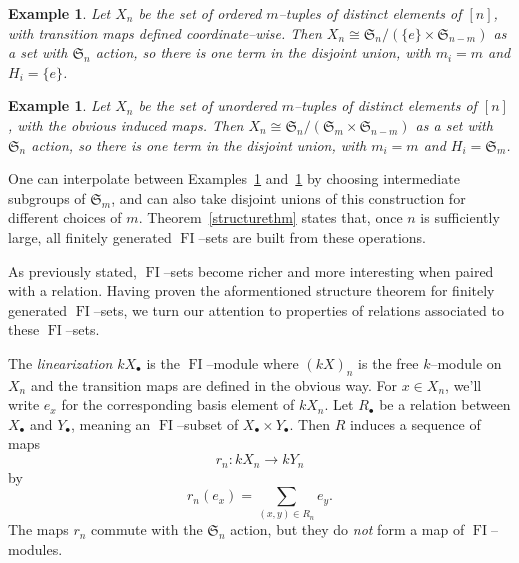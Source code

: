 \documentclass[10pt]{amsart}
\DeclareMathOperator{\FI}{FI}
\newcommand{\Sn}{\mathfrak{S}}
\newcommand{\dt}{\bullet}
\newtheorem{example}[theorem]{Example}
\theoremstyle{definition}
\begin{document}
\begin{example} \label{TheoremAExample1}
Let $X_n$ be the set of ordered $m$--tuples of distinct elements of $[n]$, with transition maps defined coordinate--wise. Then $X_n \cong \Sn_n/(\{ e \} \times \Sn_{n-m} )$ as a set with $\Sn_n$ action, so there is one term in the disjoint union, with $m_i=m$ and $H_i = \{ e \}$.
\end{example}


\begin{example} \label{TheoremAExample2}
Let $X_n$ be the set of unordered $m$--tuples of distinct elements of $[n]$, with the obvious induced maps. Then $X_n \cong \Sn_n/(\Sn_m \times \Sn_{n-m} )$ as a set with $\Sn_n$ action, so there is one term in the disjoint union, with $m_i=m$ and $H_i = \Sn_m$.
\end{example}

One can interpolate between Examples~\ref{TheoremAExample1} and~\ref{TheoremAExample2} by choosing intermediate subgroups of $\Sn_m$, and can also take disjoint unions of this construction for different choices of $m$. Theorem~\ref{structurethm} states that, once $n$ is sufficiently large, all finitely generated $\FI$--sets are built from these operations.

As previously stated, $\FI$--sets become richer and more interesting when paired with a relation. Having proven the aformentioned structure theorem for finitely generated $\FI$--sets, we turn our attention to properties of relations associated to these $\FI$--sets.

The \emph{linearization} $k X_{\dt}$ is the $\FI$--module where $(k X)_n$ is the free $k$--module on $X_n$ and the transition maps are defined in the obvious way. For $x \in X_n$, we'll write $e_x$ for the corresponding basis element of $k X_n$.
Let $R_{\dt}$ be a relation between $X_{\dt}$ and $Y_{\dt}$, meaning an $\FI$--subset of $X_{\dt} \times Y_{\dt}$. Then $R$ induces a sequence of maps
\[ r_n : k X_n \to k Y_n \]
by
\[ r_n(e_x) = \sum_{(x,y) \in R_n} e_y. \]
The maps $r_n$ commute with the $\Sn_n$ action, but they do \emph{not} form a map of $\FI$--modules.
\end{document}
